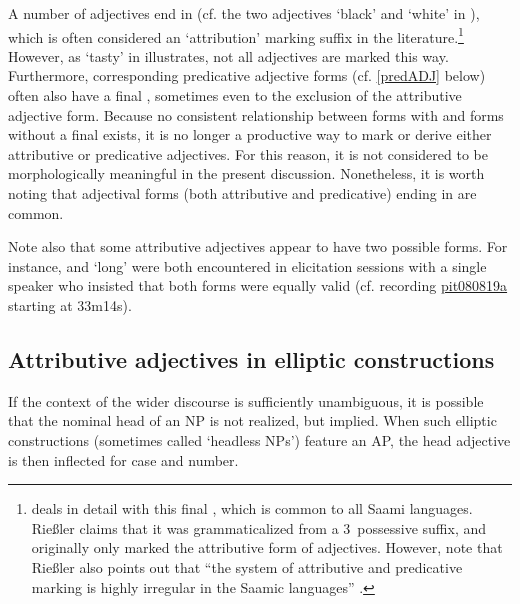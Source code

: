 A number of adjectives end in  (cf. the two adjectives  ‘black’ and  ‘white’ in ), which is often considered an ‘attribution’ marking suffix in the literature.\footnote{\citet[215-228]{Riessler2011} deals in detail with this final , which is common to all Saami languages. Rießler claims that it was grammaticalized from a 3\SGs\ possessive suffix, and originally only marked the attributive form of adjectives. However, note that Rießler also points out that “the system of attributive and predicative marking is highly irregular in the Saamic languages” \citep[215]{Riessler2011}.} 
However, as  ‘tasty’ in  illustrates, not all adjectives are marked this way. Furthermore, corresponding predicative adjective forms (cf. \SEC\ref{predADJ} below) often also have a final , sometimes even to the exclusion of the attributive adjective form. Because no consistent relationship between forms with and forms without a final  exists, it is no longer a productive way to mark or derive either attributive or predicative adjectives. For this reason, it is not considered to be morphologically meaningful in the present discussion. Nonetheless, it is worth noting that adjectival forms (both attributive and predicative) ending in  are common. 

Note also that some attributive adjectives appear to have two possible forms. For instance,  and  ‘long’ were both encountered in elicitation sessions with a single speaker who insisted that both forms were equally valid (cf. recording \hyperlink{pit080819a}{pit080819a} starting at 33m14s). %

\vfill
\subsection{Attributive adjectives in elliptic constructions}\label{ADJinHeadlessNPs}
If the context of the wider discourse is sufficiently unambiguous, it is possible that the nominal head of an NP is not realized, but implied. %
When such elliptic constructions (sometimes called ‘headless NPs’) feature an AP, the head adjective is then inflected for case and number. 

